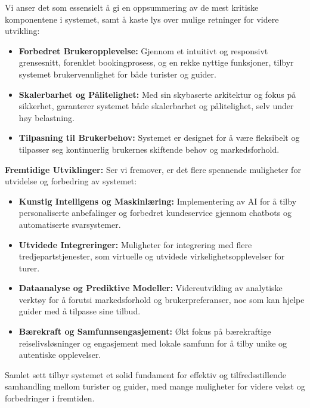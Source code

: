 \documentclass[../doc.tex]{subfiles}
\begin{document}
Vi anser det som essensielt å gi en oppsummering av de mest kritiske komponentene i systemet, samt å kaste lys over mulige retninger for videre utvikling:
\begin{itemize}
    \item \textbf{Forbedret Brukeropplevelse:} Gjennom et intuitivt og responsivt grensesnitt, forenklet bookingprosess, og en rekke nyttige funksjoner, tilbyr systemet brukervennlighet for både turister og guider.
    
    \item \textbf{Skalerbarhet og Pålitelighet:} Med sin skybaserte arkitektur og fokus på sikkerhet, garanterer systemet både skalerbarhet og pålitelighet, selv under høy belastning.
    
    \item \textbf{Tilpasning til Brukerbehov:} Systemet er designet for å være fleksibelt og tilpasser seg kontinuerlig brukernes skiftende behov og markedsforhold.
\end{itemize}

\textbf{Fremtidige Utviklinger:}
Ser vi fremover, er det flere spennende muligheter for utvidelse og forbedring av systemet:

\begin{itemize}
    \item \textbf{Kunstig Intelligens og Maskinlæring:} Implementering av AI for å tilby personaliserte anbefalinger og forbedret kundeservice gjennom chatbots og automatiserte svarsystemer.
    
    \item \textbf{Utvidede Integreringer:} Muligheter for integrering med flere tredjepartstjenester, som virtuelle og utvidede virkelighetsopplevelser for turer.
    
    \item \textbf{Dataanalyse og Prediktive Modeller:} Videreutvikling av analytiske verktøy for å forutsi markedsforhold og brukerpreferanser, noe som kan hjelpe guider med å tilpasse sine tilbud.
    
    \item \textbf{Bærekraft og Samfunnsengasjement:} Økt fokus på bærekraftige reiselivsløsninger og engasjement med lokale samfunn for å tilby unike og autentiske opplevelser.
\end{itemize}

Samlet sett tilbyr systemet et solid fundament for effektiv og tilfredsstillende samhandling mellom turister og guider, med mange muligheter for videre vekst og forbedringer i fremtiden.
\end{document}
